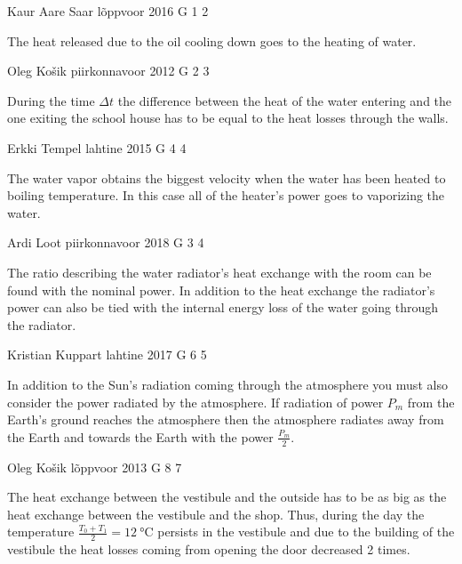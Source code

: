 \documentclass[11pt]{article}
\begin{document}
{Kaur Aare Saar} %
{lõppvoor} %
{2016} %
{G 1} %
{2} %
{

\ifEngHint
The heat released due to the oil cooling down goes to the heating of water.
\fi
}

{Oleg Košik} %
{piirkonnavoor} %
{2012} %
{G 2} %
{3} %
{

\ifEngHint
During the time $\Delta t$ the difference between the heat of the water entering and the one exiting the school house has to be equal to the heat losses through the walls.
\fi
}

{Erkki Tempel} %
{lahtine} %
{2015} %
{G 4} %
{4} %
{

\ifEngHint
The water vapor obtains the biggest velocity when the water has been heated to boiling temperature. In this case all of the heater’s power goes to vaporizing the water.
\fi
}

{Ardi Loot} %
{piirkonnavoor} %
{2018} %
{G 3} %
{4} %
{

\ifEngHint
The ratio describing the water radiator’s heat exchange with the room can be found with the nominal power. In addition to the heat exchange the radiator’s power can also be tied with the internal energy loss of the water going through the radiator. 
\fi
}

{Kristian Kuppart} %
{lahtine} %
{2017} %
{G 6} %
{5} %
{

\ifEngHint
In addition to the Sun’s radiation coming through the atmosphere you must also consider the power radiated by the atmosphere. If radiation of power $P_m$ from the Earth’s ground reaches the atmosphere then the atmosphere radiates away from the Earth and towards the Earth with the power $\frac{P_m}{2}$.
\fi
}

{Oleg Košik} %
{lõppvoor} %
{2013} %
{G 8} %
{7} %
{

\ifEngHint
The heat exchange between the vestibule and the outside has to be as big as the heat exchange between the vestibule and the shop. Thus, during the day the temperature $\frac{T_0+T_1}{2}=\SI{12}{\celsius}$ persists in the vestibule and due to the building of the vestibule the heat losses coming from opening the door decreased 2 times.
\fi
}
\end{document}
